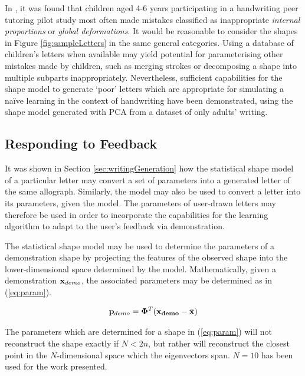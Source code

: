 \documentclass{sig-alternate}
\begin{document}
In \cite{Chandra2013}, it was found that children aged 4-6 years participating%
%
%
in a handwriting peer tutoring pilot study most often made mistakes classified
as inappropriate \emph{internal proportions} or \emph{global deformations}. It
would be reasonable to consider the shapes in Figure \ref{fig:sampleLetters} in
the same general categories. Using a database of children's letters when
available may yield potential for parameterising other mistakes made by
children, such as merging strokes or decomposing a shape into multiple subparts
inappropriately. Nevertheless, sufficient capabilities for the shape model to
generate `poor' letters which are appropriate for simulating a na\"ive learning
in the context of handwriting have been demonstrated, using the shape model
generated with PCA from a dataset of only adults' writing.


\subsection{Responding to Feedback}

It was shown in Section \ref{sec:writingGeneration} how the statistical shape
model of a particular letter may convert a set of parameters into a generated
letter of the same allograph. Similarly, the model may also be used to convert a
letter into its parameters, given the model. The parameters of user-drawn
letters may therefore be used in order to incorporate the capabilities for the
learning algorithm to adapt to the user's feedback via demonstration.

The statistical shape model may be used to determine the parameters of a
demonstration shape by projecting the features of the observed shape into the
lower-dimensional space determined by the model. Mathematically, given a
demonstration ${\bf x}_{demo}$, the associated parameters may be determined as in
(\ref{eq:param}).

\begin{equation}\label{eq:param}
{\bf p}_{demo} ={\bf \Phi}^T ({\bf{x}_{demo}}-\bf{\bar{x}})
\end{equation}

The parameters which are determined for a shape in (\ref{eq:param}) will not
reconstruct the shape exactly if $N<2n$, but rather will reconstruct the closest
point in the $N$-dimensional space which the eigenvectors span. $N=10$ has been
used for the work presented.
\end{document}
